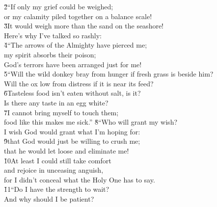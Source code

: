 \begin{poetry}
\poeml \v{2}``If only my grief could be weighed; \\
\poemll    or my calamity piled together on a balance scale! \\
\poeml \v{3}It would weigh more than the sand on the seashore! \\
\poemll    Here's why I've talked so rashly: \\
\poeml \v{4}``The arrows of the Almighty have pierced me; \\
\poemll    my spirit absorbs their poison; \\
\poemlll       God's terrors have been arranged just for me! \\
\poeml \v{5}``Will the wild donkey bray from hunger if fresh grass is beside him? \\
\poemll    Will the ox low from distress if it is near its feed? \\
\poeml \v{6}Tasteless food isn't eaten without salt, is it? \\
\poemll    Is there any taste in an egg white? \\
\poeml \v{7}I cannot bring myself to touch them; \\
\poemll    food like this makes me sick.''
\poeml \v{8}``Who will grant my wish? \\
\poemll    I wish God would grant what I'm hoping for: \\
\poeml \v{9}that God would just be willing to crush me; \\
\poemll    that he would let loose and eliminate me! \\
\poeml \v{10}At least I could still take comfort \\
\poemll    and rejoice in unceasing anguish, \\
\poemlll       for I didn't conceal what the Holy One has to say. \\
\poeml \v{11}``Do I have the strength to wait? \\
\poemll    And why should I be patient? \\

\end{poetry}
